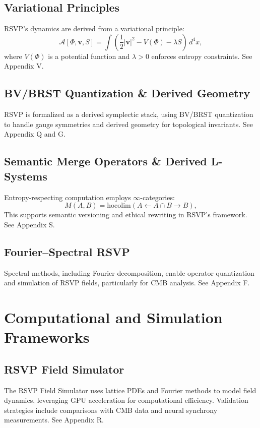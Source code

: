 \documentclass[12pt]{report}
\newcommand{\PhiRSVP}{\Phi}
\newcommand{\vRSVP}{\mathbf{v}}
\newcommand{\SRSVP}{S}
\begin{document}
\chapter{Variational Principles}
RSVP’s dynamics are derived from a variational principle:
\begin{equation}
\mathcal{A}[\PhiRSVP, \vRSVP, \SRSVP] = \int \left( \frac{1}{2} |\vRSVP|^2 - V(\PhiRSVP) - \lambda \SRSVP \right) \, d^4x, \label{eq:action}
\end{equation}
where \(V(\PhiRSVP)\) is a potential function and \(\lambda > 0\) enforces entropy constraints. See Appendix V.

\chapter{BV/BRST Quantization \& Derived Geometry}
RSVP is formalized as a derived symplectic stack, using BV/BRST quantization to handle gauge symmetries and derived geometry for topological invariants. See Appendix Q and G.

\chapter{Semantic Merge Operators \& Derived L-Systems}
Entropy-respecting computation employs \(\infty\)-categories:
\begin{equation}
M(A, B) = \mathrm{hocolim}(A \leftarrow A \cap B \to B), \label{eq:merge}
\end{equation}
This supports semantic versioning and ethical rewriting in RSVP’s framework. See Appendix S.

\chapter{Fourier–Spectral RSVP}
Spectral methods, including Fourier decomposition, enable operator quantization and simulation of RSVP fields, particularly for CMB analysis. See Appendix F.

\part{Computational and Simulation Frameworks}

\chapter{RSVP Field Simulator}
The RSVP Field Simulator uses lattice PDEs and Fourier methods to model field dynamics, leveraging GPU acceleration for computational efficiency. Validation strategies include comparisons with CMB data and neural synchrony measurements. See Appendix R.
\end{document}
